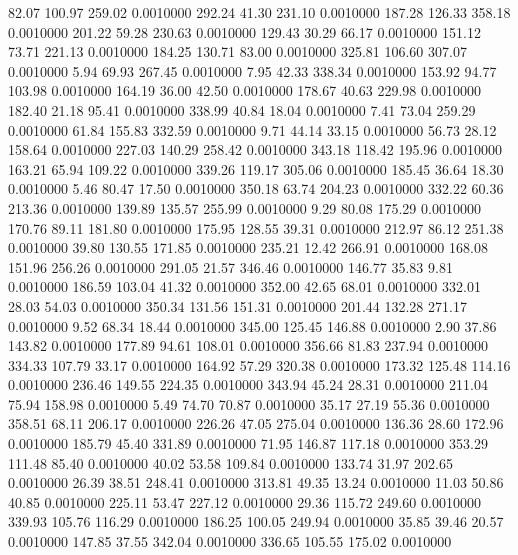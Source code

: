   82.07  100.97  259.02   0.0010000
 292.24   41.30  231.10   0.0010000
 187.28  126.33  358.18   0.0010000
 201.22   59.28  230.63   0.0010000
 129.43   30.29   66.17   0.0010000
 151.12   73.71  221.13   0.0010000
 184.25  130.71   83.00   0.0010000
 325.81  106.60  307.07   0.0010000
   5.94   69.93  267.45   0.0010000
   7.95   42.33  338.34   0.0010000
 153.92   94.77  103.98   0.0010000
 164.19   36.00   42.50   0.0010000
 178.67   40.63  229.98   0.0010000
 182.40   21.18   95.41   0.0010000
 338.99   40.84   18.04   0.0010000
   7.41   73.04  259.29   0.0010000
  61.84  155.83  332.59   0.0010000
   9.71   44.14   33.15   0.0010000
  56.73   28.12  158.64   0.0010000
 227.03  140.29  258.42   0.0010000
 343.18  118.42  195.96   0.0010000
 163.21   65.94  109.22   0.0010000
 339.26  119.17  305.06   0.0010000
 185.45   36.64   18.30   0.0010000
   5.46   80.47   17.50   0.0010000
 350.18   63.74  204.23   0.0010000
 332.22   60.36  213.36   0.0010000
 139.89  135.57  255.99   0.0010000
   9.29   80.08  175.29   0.0010000
 170.76   89.11  181.80   0.0010000
 175.95  128.55   39.31   0.0010000
 212.97   86.12  251.38   0.0010000
  39.80  130.55  171.85   0.0010000
 235.21   12.42  266.91   0.0010000
 168.08  151.96  256.26   0.0010000
 291.05   21.57  346.46   0.0010000
 146.77   35.83    9.81   0.0010000
 186.59  103.04   41.32   0.0010000
 352.00   42.65   68.01   0.0010000
 332.01   28.03   54.03   0.0010000
 350.34  131.56  151.31   0.0010000
 201.44  132.28  271.17   0.0010000
   9.52   68.34   18.44   0.0010000
 345.00  125.45  146.88   0.0010000
   2.90   37.86  143.82   0.0010000
 177.89   94.61  108.01   0.0010000
 356.66   81.83  237.94   0.0010000
 334.33  107.79   33.17   0.0010000
 164.92   57.29  320.38   0.0010000
 173.32  125.48  114.16   0.0010000
 236.46  149.55  224.35   0.0010000
 343.94   45.24   28.31   0.0010000
 211.04   75.94  158.98   0.0010000
   5.49   74.70   70.87   0.0010000
  35.17   27.19   55.36   0.0010000
 358.51   68.11  206.17   0.0010000
 226.26   47.05  275.04   0.0010000
 136.36   28.60  172.96   0.0010000
 185.79   45.40  331.89   0.0010000
  71.95  146.87  117.18   0.0010000
 353.29  111.48   85.40   0.0010000
  40.02   53.58  109.84   0.0010000
 133.74   31.97  202.65   0.0010000
  26.39   38.51  248.41   0.0010000
 313.81   49.35   13.24   0.0010000
  11.03   50.86   40.85   0.0010000
 225.11   53.47  227.12   0.0010000
  29.36  115.72  249.60   0.0010000
 339.93  105.76  116.29   0.0010000
 186.25  100.05  249.94   0.0010000
  35.85   39.46   20.57   0.0010000
 147.85   37.55  342.04   0.0010000
 336.65  105.55  175.02   0.0010000
